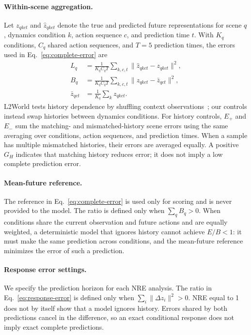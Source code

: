 \paragraph{Within-scene aggregation.}
Let $z_{qkct}$ and $\hat z_{qkct}$ denote the true and predicted future representations for scene $q$, dynamics condition $k$, action sequence $c$, and prediction time $t$.
With $K_q$ conditions, $C_q$ shared action sequences, and $T=5$ prediction times, the errors used in Eq.~\ref{eq:complete-error} are
\[
\begin{aligned}
L_q&=\frac{1}{K_qC_qT}\sum_{k,c,t}\|\hat z_{qkct}-z_{qkct}\|^2,\\
B_q&=\frac{1}{K_qC_qT}\sum_{k,c,t}\|z_{qkct}-\bar z_{qct}\|^2,\\
\bar z_{qct}&=\frac{1}{K_q}\sum_k z_{qkct}.
\end{aligned}
\]
L2World tests history dependence by shuffling context observations~\cite{wang2026context}; our controls instead swap histories between dynamics conditions.
For history controls, $E_+$ and $E_-$ sum the matching- and mismatched-history scene errors using the same averaging over conditions, action sequences, and prediction times.
When a sample has multiple mismatched histories, their errors are averaged equally.
A positive $G_H$ indicates that matching history reduces error; it does not imply a low complete prediction error.

\paragraph{Mean-future reference.}
The reference in Eq.~\ref{eq:complete-error} is used only for scoring and is never provided to the model.
The ratio is defined only when $\sum_q B_q>0$.
When conditions share the current observation and future actions and are equally weighted, a deterministic model that ignores history cannot achieve $E/B<1$: it must make the same prediction across conditions, and the mean-future reference minimizes the error of such a prediction.

\paragraph{Response error settings.}
We specify the prediction horizon for each NRE analysis.
The ratio in Eq.~\ref{eq:response-error} is defined only when $\sum_i\|\Delta z_i\|^2>0$.
NRE equal to 1 does not by itself show that a model ignores history.
Errors shared by both predictions cancel in the difference, so an exact conditional response does not imply exact complete predictions.

